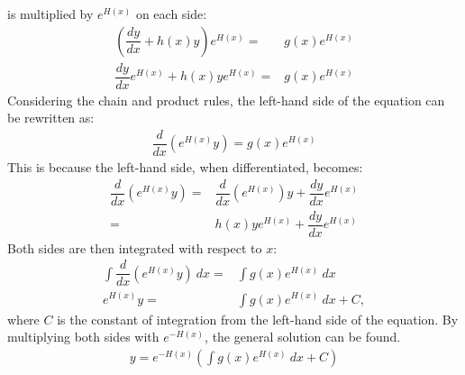 \begin{prof}{}{}
 is multiplied by $e^{H(x)}$ on each side:
\begin{align*}
\left(\dfrac{dy}{dx}+h(x)y\right)e^{H(x)}=&g(x)e^{H(x)}
\\
\dfrac{dy}{dx}e^{H(x)}+h(x)ye^{H(x)}=&g(x)e^{H(x)}
\end{align*}
Considering the chain and product rules, the left-hand side of the equation can be rewritten as:
\begin{align*}
\dfrac{d}{dx}\left(e^{H(x)}y\right)=g(x)e^{H(x)}
\end{align*}
This is because the left-hand side, when differentiated, becomes:
\begin{align*}
\dfrac{d}{dx}\left(e^{H(x)}y\right)=&\dfrac{d}{dx}\left(e^{H(x)}\right)y+\dfrac{dy}{dx}e^{H(x)} \\
 =& h(x)ye^{H(x)}+\dfrac{dy}{dx}e^{H(x)}
\end{align*}
Both sides are then integrated with respect to $x$:
\begin{align*}
\int\dfrac{d}{dx}\left(e^{H(x)}y\right)\ dx=&\int g(x)e^{H(x)}\ dx
\\
e^{H(x)}y=&\int g(x)e^{H(x)}\ dx+C,
\end{align*}
where $C$ is the constant of integration from the left-hand side of the  equation. By multiplying both sides with $e^{-H(x)}$, the general solution can be found.
\begin{align}
y=e^{-H(x)}\left(\int g(x)e^{H(x)}\ dx+C\right)
\end{align}
\end{prof}

